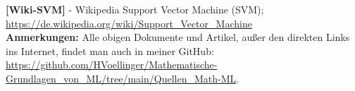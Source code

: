 \documentclass[12pt]{article}
\begin{document}
%
\textbf{[Wiki-SVM]} - Wikipedia Support Vector Machine (SVM); \url{https://de.wikipedia.org/wiki/Support_Vector_Machine}\\[0.2cm] 
%
\textbf{Anmerkungen:} Alle obigen Dokumente und Artikel, außer den direkten Links ins Internet, findet man auch in meiner GitHub: \url{https://github.com/HVoellinger/Mathematische-Grundlagen_von_ML/tree/main/Quellen_Math-ML}.\\[0.2cm]  
%
%
%

{\color{blue}{\printindex}}
\end{document}
